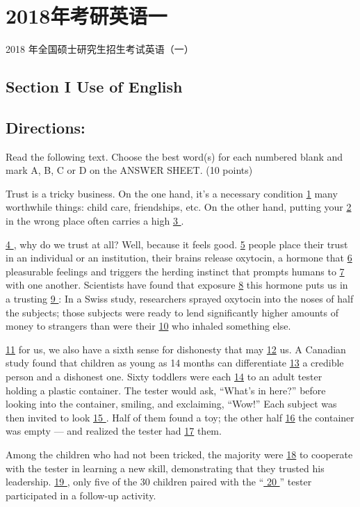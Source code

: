 \documentclass[UTF8,11pt]{ctexart}
\begin{document}
\section*{2018年考研英语一}
2018 年全国硕士研究生招生考试英语（一）


\subsection*{\textbf{Section I Use of English}}


\subsection*{\textbf{Directions:}}


Read the following text. Choose the best word(s) for each numbered blank and mark A, B, C or D on the ANSWER SHEET. (10 points)


Trust is a tricky business. On the one hand, it’s a necessary condition \uline{1} many worthwhile things: child care, friendships, etc. On the other hand, putting your \uline{2} in the wrong place often carries a high \uline{3 }.


\uline{4 }, why do we trust at all? Well, because it feels good. \uline{5} people place their trust in an individual or an institution, their brains release oxytocin, a hormone that \uline{6} pleasurable feelings and triggers the herding instinct that prompts humans to \uline{7} with one another. Scientists have found that exposure \uline{8} this hormone puts us in a trusting \uline{9 }: In a Swiss study, researchers sprayed oxytocin into the noses of half the subjects; those subjects were ready to lend significantly higher amounts of money to strangers than were their \uline{10} who inhaled something else.


\uline{11} for us, we also have a sixth sense for dishonesty that may \uline{12} us. A Canadian study found that children as young as 14 months can differentiate \uline{13} a credible person and a dishonest one. Sixty toddlers were each \uline{14} to an adult tester holding a plastic container. The tester would ask, “What’s in here?” before looking into the container, smiling, and exclaiming, “Wow!” Each subject was then invited to look \uline{15 }. Half of them found a toy; the other half \uline{16} the container was empty — and realized the tester had \uline{17} them.


Among the children who had not been tricked, the majority were \uline{18} to cooperate with the tester in learning a new skill, demonstrating that they trusted his leadership. \uline{19 }, only five of the 30 children paired with the “\uline{ 20 }” tester participated in a follow-up activity.
\end{document}
